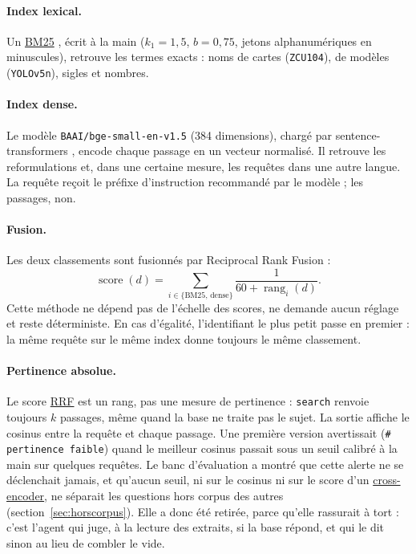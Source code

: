 \documentclass[11pt,a4paper]{article}
\newcommand{\cmd}[1]{\texttt{#1}}
\newcommand{\gl}[2]{\hyperlink{gl:#1}{\textcolor{glcolor}{#2}}}
\begin{document}
\paragraph{Index lexical.} Un \gl{BM25}{BM25} \citep{robertson2009bm25}, écrit à la main
($k_1 = 1{,}5$, $b = 0{,}75$, jetons alphanumériques en minuscules), retrouve les termes
exacts : noms de cartes (\cmd{ZCU104}), de modèles (\cmd{YOLOv5n}), sigles et nombres.

\paragraph{Index dense.} Le modèle \cmd{BAAI/bge-small-en-v1.5} \citep{xiao2024cpack}
(384 dimensions), chargé par sentence-transformers \citep{reimers2019sbert}, encode chaque
passage en un vecteur normalisé. Il retrouve les reformulations et, dans une certaine
mesure, les requêtes dans une autre langue. La requête reçoit le préfixe d'instruction
recommandé par le modèle ; les passages, non.

\paragraph{Fusion.} Les deux classements sont fusionnés par Reciprocal Rank Fusion
\citep{cormack2009rrf} :
\begin{equation}
  \operatorname{score}(d) = \sum_{i \in \{\text{BM25},\,\text{dense}\}}
    \frac{1}{60 + \operatorname{rang}_i(d)} .
\end{equation}
Cette méthode ne dépend pas de l'échelle des scores, ne demande aucun réglage et reste
déterministe. En cas d'égalité, l'identifiant le plus petit passe en premier : la même
requête sur le même index donne toujours le même classement.

\paragraph{Pertinence absolue.} Le score \gl{RRF}{RRF} est un rang, pas une mesure de pertinence :
\cmd{search} renvoie toujours $k$ passages, même quand la base ne traite pas le sujet. La
sortie affiche le cosinus entre la requête et chaque passage. Une première version avertissait
(\cmd{\# pertinence faible}) quand le meilleur cosinus passait sous un seuil calibré à la
main sur quelques requêtes. Le banc d'évaluation a montré que cette alerte ne se
déclenchait jamais, et qu'aucun seuil, ni sur le cosinus ni sur le score d'un
\gl{crossenc}{cross-encoder}, ne séparait les questions hors corpus des autres
(section~\ref{sec:horscorpus}). Elle a donc été retirée, parce qu'elle rassurait à tort :
c'est l'agent qui juge, à la lecture des extraits, si la base répond, et qui le dit
sinon au lieu de combler le vide.
\end{document}
